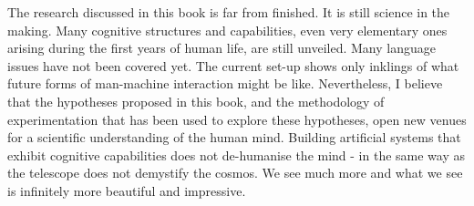The research discussed in this book is far from finished. It is 
still science in the making. Many cognitive structures
and capabilities, even very elementary ones arising 
during the first years of human life, are still unveiled. Many
language issues
have not been covered yet. The current set-up 
shows only inklings of what future forms of man-machine
interaction might be like. Nevertheless, I believe that 
the hypotheses proposed in this book, and the 
methodology of experimentation that has been used to 
explore these hypotheses, open new venues for 
a scientific understanding of the human mind. Building 
artificial systems that exhibit cognitive capabilities
does not de-humanise the mind - in the 
same way as the telescope does not demystify the cosmos. 
We see much more and what we see is infinitely more 
beautiful and impressive. 

%
